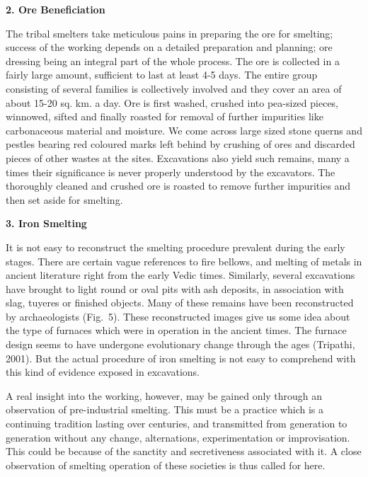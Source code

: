 \noindent \textbf{\large 2. Ore Beneficiation}

The tribal smelters take meticulous pains in preparing the ore for smelting; success of the working depends on a detailed preparation and planning; ore dressing being an integral part of the whole process. The ore is collected in a fairly large amount, sufficient to last at least 4-5 days. The entire group consisting of several families is collectively involved and they cover an area of about 15-20 sq. km. a day. Ore is first washed, crushed into pea-sized pieces, winnowed, sifted and finally roasted for removal of further impurities like carbonaceous material and moisture. We come across large sized stone querns and pestles bearing red coloured marks left behind by crushing of ores and discarded pieces of other wastes at the sites. Excavations also yield such remains, many a times their significance is never properly understood by the excavators. The thoroughly cleaned and crushed ore is roasted to remove further impurities and then set aside for smelting.

\noindent \textbf{\large 3. Iron Smelting}

It is not easy to reconstruct the smelting procedure prevalent during the early stages. There are certain vague references to fire bellows, and melting of metals in ancient literature right from the early Vedic times. Similarly, several excavations have brought to light round or oval pits with ash deposits, in association with slag, tuyeres or finished objects. Many of these remains have been reconstructed by archaeologists (Fig.~5). These reconstructed images give us some idea about the type of furnaces which were in operation in the ancient times. The furnace design seems to have undergone evolutionary change through the ages (Tripathi, 2001). But the actual procedure of iron smelting is not easy to comprehend with this kind of evidence exposed in excavations.

A real insight into the working, however, may be gained only through an observation of pre-industrial smelting. This must be a practice which is a continuing tradition lasting over centuries, and transmitted from generation to generation without any change, alternations, experimentation or improvisation. This could be because of the sanctity and secretiveness associated with it. A close observation of smelting operation of these societies is thus called for here.

